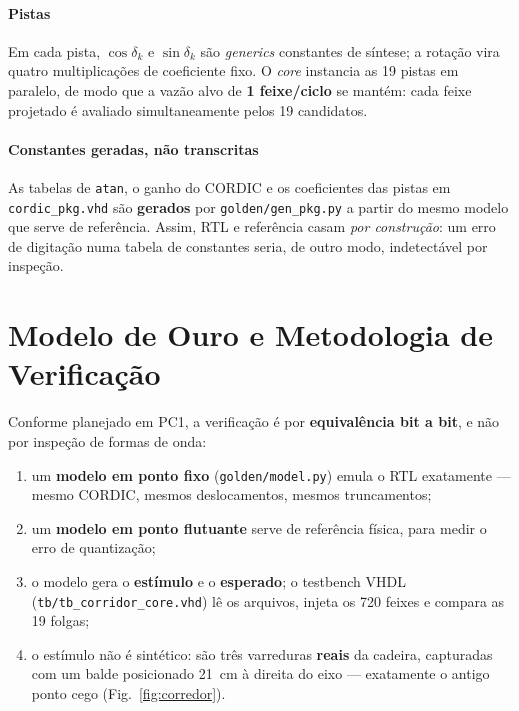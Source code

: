 \documentclass[conference]{IEEEtran}
\begin{document}
\paragraph{Pistas}
Em cada pista, $\cos\delta_k$ e $\sin\delta_k$ s\~ao \emph{generics} constantes de
s\'intese; a rota\c{c}\~ao vira quatro multiplica\c{c}\~oes de coeficiente fixo. O
\emph{core} instancia as \num{19} pistas em paralelo, de modo que a vaz\~ao alvo
de \textbf{1 feixe/ciclo} se mant\'em: cada feixe projetado \'e avaliado
simultaneamente pelos \num{19} candidatos.

\paragraph{Constantes geradas, n\~ao transcritas}
As tabelas de \texttt{atan}, o ganho do CORDIC e os coeficientes das pistas em
\texttt{cordic\_pkg.vhd} s\~ao \textbf{gerados} por \texttt{golden/gen\_pkg.py} a
partir do mesmo modelo que serve de refer\^encia. Assim, RTL e refer\^encia casam
\emph{por constru\c{c}\~ao}: um erro de digita\c{c}\~ao numa tabela de constantes
seria, de outro modo, indetect\'avel por inspe\c{c}\~ao.

\section{Modelo de Ouro e Metodologia de Verifica\c{c}\~ao}

Conforme planejado em PC1, a verifica\c{c}\~ao \'e por \textbf{equival\^encia bit
a bit}, e n\~ao por inspe\c{c}\~ao de formas de onda:
\begin{enumerate}
\item um \textbf{modelo em ponto fixo} (\texttt{golden/model.py}) emula o RTL
exatamente --- mesmo CORDIC, mesmos deslocamentos, mesmos truncamentos;
\item um \textbf{modelo em ponto flutuante} serve de refer\^encia f\'isica, para
medir o erro de quantiza\c{c}\~ao;
\item o modelo gera o \textbf{est\'imulo} e o \textbf{esperado}; o testbench VHDL
(\texttt{tb/tb\_corridor\_core.vhd}) l\^e os arquivos, injeta os \num{720} feixes
e compara as \num{19} folgas;
\item o est\'imulo n\~ao \'e sint\'etico: s\~ao tr\^es varreduras \textbf{reais}
da cadeira, capturadas com um balde posicionado \SI{21}{\centi\metre} \`a direita
do eixo --- exatamente o antigo ponto cego (Fig.~\ref{fig:corredor}).
\end{enumerate}
\end{document}
